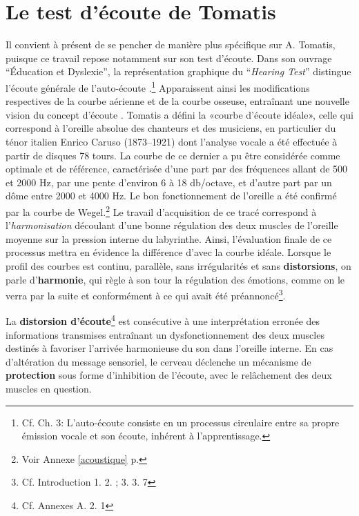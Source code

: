 
\section{Le test d'écoute de Tomatis}

Il convient à présent de se pencher de manière plus spécifique sur
A. Tomatis, puisque ce travail repose notamment sur son test d'écoute.
Dans son ouvrage ``Éducation et
    Dyslexie''\autocite{tomatis:education}, la représentation graphique du
 ``\emph{Hearing Test}'' distingue l'écoute générale de
 l'auto-écoute \autocite{tomatis_oreille_1991}.\footnote{Cf. Ch. 3: L'auto-écoute consiste en un processus
   circulaire entre sa propre  émission vocale et son écoute, inhérent
   à l'apprentissage. }
 Apparaissent ainsi les modifications respectives
 de la courbe aérienne et de la courbe osseuse, entraînant une nouvelle vision
 du concept d'écoute \autocite{tomatis_conf}.%
 Tomatis a défini la «courbe d'écoute idéale», celle qui correspond à l'oreille absolue
des chanteurs et des musiciens, en particulier du ténor italien Enrico
Caruso (1873--1921) dont l'analyse vocale a été effectuée à partir de
disques 78 tours. La courbe de ce dernier a pu être considérée comme
optimale et de référence, caractérisée d'une part par des fréquences allant de 500 et 2000
Hz, par une pente d\textquoteright environ 6 à 18 db/octave,
et d'autre part par un dôme entre 2000 et 4000 Hz.
Le bon fonctionnement de l'oreille a été confirmé par la courbe
de Wegel.\footnote{
		Voir Annexe \ref{acoustique} p. \pageref{acoustique}}
 Le travail d'acquisition de ce tracé correspond à l'\textsl{harmonisation}
découlant d'une bonne régulation des deux muscles de l'oreille moyenne
sur la pression interne du
labyrinthe.
Ainsi, l'évaluation finale de ce processus mettra en évidence la différence
d'avec la courbe idéale.
Lorsque le profil des
courbes est continu, parallèle, sans irrégularités et sans
\textbf{distorsions}, on parle d'\textbf{harmonie}, qui règle à son tour
la régulation des émotions, comme on le verra par la suite et conformément à
ce qui avait été préannoncé\footnote{Cf. Introduction 1. 2. ; 3. 3. 7}.



La \textbf{distorsion d'écoute}\footnote{Cf. Annexes A. 2. 1}
 est consécutive à une interprétation
erronée des informations transmises entraînant un dysfonctionnement
des deux muscles destinés à favoriser l'arrivée
harmonieuse du son dans l'oreille interne.
En cas d'altération du message sensoriel,
le cerveau déclenche un mécanisme de\textbf{ protection} sous forme
d'inhibition de l'écoute, avec le relâchement des deux muscles en
question.


